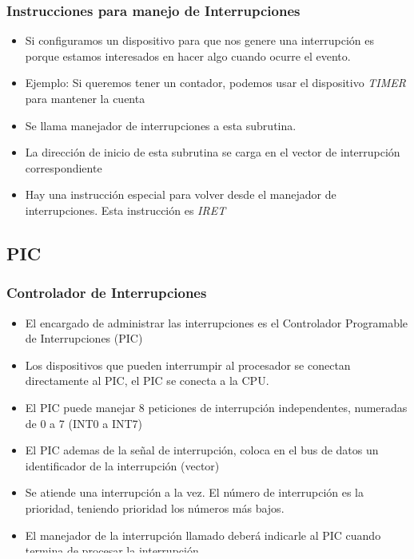 \documentclass{beamer}
\begin{document}
\begin{frame}
\frametitle{Instrucciones para  manejo de Interrupciones}


\begin{itemize}

 \item Si configuramos un dispositivo para que nos genere una interrupción es porque estamos interesados en hacer algo cuando ocurre el evento.
 \item Ejemplo: Si queremos tener un contador, podemos usar el dispositivo \emph{TIMER} para mantener la cuenta
 \item Se llama manejador de interrupciones a esta subrutina.
 \item La dirección de inicio de esta subrutina se carga en el vector de interrupción correspondiente
 \item Hay una instrucción especial para volver desde el manejador de interrupciones. Esta instrucción es \emph{IRET}
\end{itemize}

\end{frame}


\subsection{PIC}
\begin{frame}
\frametitle{Controlador de Interrupciones}


\begin{itemize}
 \item El encargado de administrar las interrupciones es el Controlador Programable de Interrupciones (PIC)
 \item Los dispositivos que pueden interrumpir al procesador se conectan directamente al PIC, el PIC se conecta a la CPU.
 \item El PIC puede manejar 8 peticiones de interrupción independentes, numeradas de 0 a 7 (INT0 a INT7)
 \item El PIC ademas de la señal de interrupción, coloca en el bus de datos un identificador de la interrupción (vector)
 \item Se atiende una interrupción a la vez. El número de interrupción es la prioridad, teniendo prioridad los números más bajos.
 \item El manejador de la interrupción llamado deberá indicarle al PIC cuando termina de procesar la interrupción. 
 \item Hasta que no se termine de atender a esta interrupción no se podrá atender a la siguiente interrupción.
\end{itemize}
\end{frame}
\end{document}

